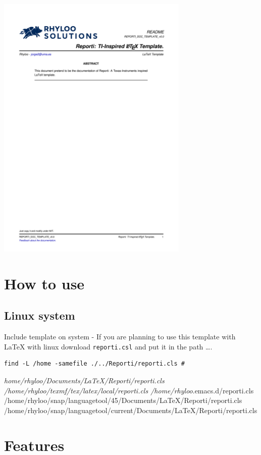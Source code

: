 \documentclass[english]{reporti}
\begin{document}
\begin{center}
\includegraphics[fbox,height=35em]{./README.pdf}
\end{center}

\section{How to use}
\label{sec:orgebf3ae3}
\subsection{Linux system}
\label{sec:orgb2db262}
Include template on system - If you are planning to use this template with \LaTeX{} with linux download \texttt{reporti.csl} and put it in the path \ldots{}.

\begin{verbatim}
find -L /home -samefile ./../Reporti/reporti.cls # 
\end{verbatim}

\emph{home/rhyloo/Documents/\LaTeX{}/Reporti/reporti.cls
/home/rhyloo/texmf/tex/latex/local/reporti.cls
/home/rhyloo}.emacs.d/reporti.cls
/home/rhyloo/snap/languagetool/45/Documents/\LaTeX{}/Reporti/reporti.cls
/home/rhyloo/snap/languagetool/current/Documents/\LaTeX{}/Reporti/reporti.cls
\section{Features}
\label{sec:orgd44179b}
\end{document}
